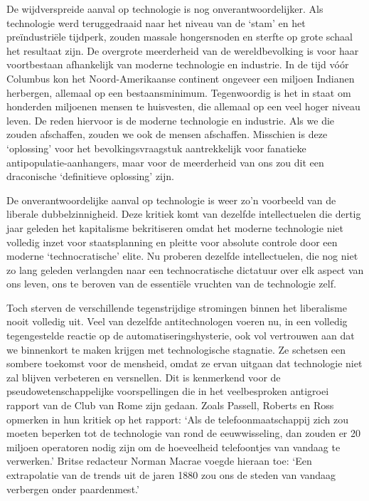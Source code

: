 \documentclass[
  a5paper,
  smalldemyvopaper,10pt,twoside,onecolumn,openright,extrafontsizes,hidelinks]{memoir}
\begin{document}
De wijdverspreide aanval op technologie is nog onverantwoordelijker. Als
technologie werd teruggedraaid naar het niveau van de `stam' en het
preïndustriële tijdperk, zouden massale hongersnoden en sterfte op grote
schaal het resultaat zijn. De overgrote meerderheid van de
wereldbevolking is voor haar voortbestaan afhankelijk van moderne
technologie en industrie. In de tijd vóór Columbus kon het
Noord-Amerikaanse continent ongeveer een miljoen Indianen herbergen,
allemaal op een bestaansminimum. Tegenwoordig is het in staat om
honderden miljoenen mensen te huisvesten, die allemaal op een veel hoger
niveau leven. De reden hiervoor is de moderne technologie en industrie.
Als we die zouden afschaffen, zouden we ook de mensen afschaffen.
Misschien is deze `oplossing' voor het bevolkingsvraagstuk aantrekkelijk
voor fanatieke antipopulatie-aanhangers, maar voor de meerderheid van
ons zou dit een draconische `definitieve oplossing' zijn.

De onverantwoordelijke aanval op technologie is weer zo'n voorbeeld van
de liberale dubbelzinnigheid. Deze kritiek komt van dezelfde
intellectuelen die dertig jaar geleden het kapitalisme bekritiseren
omdat het moderne technologie niet volledig inzet voor staatsplanning en
pleitte voor absolute controle door een moderne `technocratische' elite.
Nu proberen dezelfde intellectuelen, die nog niet zo lang geleden
verlangden naar een technocratische dictatuur over elk aspect van ons
leven, ons te beroven van de essentiële vruchten van de technologie
zelf.

Toch sterven de verschillende tegenstrijdige stromingen binnen het
liberalisme nooit volledig uit. Veel van dezelfde antitechnologen voeren
nu, in een volledig tegengestelde reactie op de automatiseringshysterie,
ook vol vertrouwen aan dat we binnenkort te maken krijgen met
technologische stagnatie. Ze schetsen een sombere toekomst voor de
mensheid, omdat ze ervan uitgaan dat technologie niet zal blijven
verbeteren en versnellen. Dit is kenmerkend voor de
pseudowetenschappelijke voorspellingen die in het veelbesproken
antigroei rapport van de Club van Rome zijn gedaan. Zoals Passell,
Roberts en Ross opmerken in hun kritiek op het rapport: `Als de
telefoonmaatschappij zich zou moeten beperken tot de technologie van
rond de eeuwwisseling, dan zouden er 20 miljoen operatoren nodig zijn om
de hoeveelheid telefoontjes van vandaag te verwerken.' Britse redacteur
Norman Macrae voegde hieraan toe: `Een extrapolatie van de trends uit de
jaren 1880 zou ons de steden van vandaag verbergen onder paardenmest.'
\end{document}
